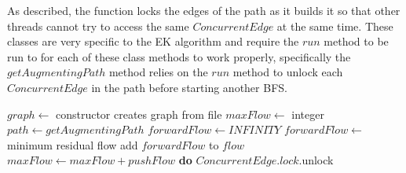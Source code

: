 As described, the function locks the edges of the path as it builds it so that other threads cannot try to access the same $ConcurrentEdge$ at the same time. These classes are very specific to the EK algorithm and require the $run$ method to be run to for each of these class methods to work properly, specifically the $getAugmentingPath$ method relies on the $run$ method to unlock each $ConcurrentEdge$ in the path before starting another BFS.

\begin{algorithmic}
        \State $graph \gets$ constructor creates graph from file
        \State $maxFlow \gets$ integer
            \State $path \gets getAugmentingPath$
                \Return
            \Else
                \State $forwardFlow \gets INFINITY$
                    \State $forwardFlow \gets$ minimum residual flow
                \EndFor
                    \State add $forwardFlow$ to $flow$
                \EndFor
                \State $maxFlow \gets maxFlow + pushFlow$
                    \State \textbf{do} $ConcurrentEdge.lock$.unlock
                \EndFor
            \EndIf
        \EndWhile
    \EndFunction
\end{algorithmic}